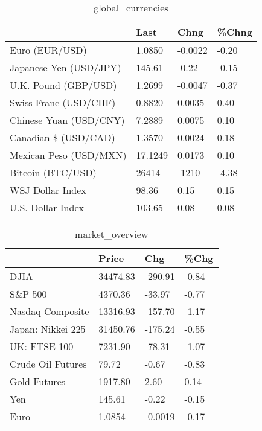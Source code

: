 \documentclass{article}%
\begin{document}
%


\begin{table}[htbp]%
\caption{global\_currencies}%
\centering%
\begin{adjustbox}{width=1\textwidth}%
\begin{tabular}{llll}
\toprule
                       &    Last &    Chng & \%Chng \\
\midrule
        Euro (EUR/USD) &  1.0850 & -0.0022 & -0.20 \\
Japanese Yen (USD/JPY) &  145.61 &   -0.22 & -0.15 \\
  U.K. Pound (GBP/USD) &  1.2699 & -0.0047 & -0.37 \\
 Swiss Franc (USD/CHF) &  0.8820 &  0.0035 &  0.40 \\
Chinese Yuan (USD/CNY) &  7.2889 &  0.0075 &  0.10 \\
  Canadian \$ (USD/CAD) &  1.3570 &  0.0024 &  0.18 \\
Mexican Peso (USD/MXN) & 17.1249 &  0.0173 &  0.10 \\
     Bitcoin (BTC/USD) &   26414 &   -1210 & -4.38 \\
      WSJ Dollar Index &   98.36 &    0.15 &  0.15 \\
     U.S. Dollar Index &  103.65 &    0.08 &  0.08 \\
\bottomrule
\end{tabular}
%
\end{adjustbox}%
\end{table}

%


\begin{table}[htbp]%
\caption{market\_overview}%
\centering%
\begin{adjustbox}{width=1\textwidth}%
\begin{tabular}{llll}
\toprule
                  &    Price &     Chg &  \%Chg \\
\midrule
             DJIA & 34474.83 & -290.91 & -0.84 \\
          S\&P 500 &  4370.36 &  -33.97 & -0.77 \\
 Nasdaq Composite & 13316.93 & -157.70 & -1.17 \\
Japan: Nikkei 225 & 31450.76 & -175.24 & -0.55 \\
     UK: FTSE 100 &  7231.90 &  -78.31 & -1.07 \\
Crude Oil Futures &    79.72 &   -0.67 & -0.83 \\
     Gold Futures &  1917.80 &    2.60 &  0.14 \\
              Yen &   145.61 &   -0.22 & -0.15 \\
             Euro &   1.0854 & -0.0019 & -0.17 \\
\bottomrule
\end{tabular}
%
\end{adjustbox}%
\end{table}

%
\end{document}
